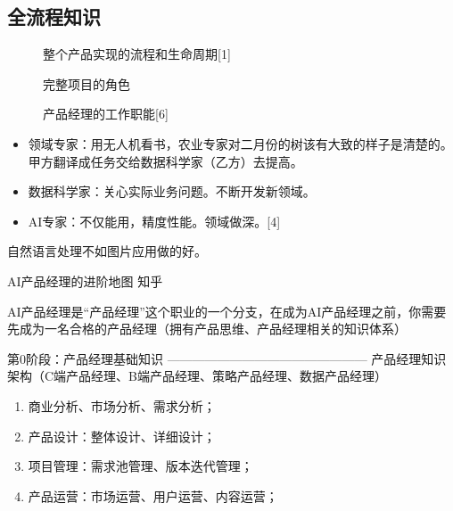\documentclass[letterpaper,10pt,english]{sphinxmanual}
\begin{document}
\subsection{全流程知识}
\label{\detokenize{chapter_knowledge/index:chap-skill}}\label{\detokenize{chapter_knowledge/index:id1}}\label{\detokenize{chapter_knowledge/index::doc}}
\begin{figure}[H]
\centering
\capstart

\noindent{}
\caption{整个产品实现的流程和生命周期{[}1{]}}\label{\detokenize{chapter_knowledge/index:id2}}\end{figure}

\begin{figure}[H]
\centering
\capstart

\noindent{}
\caption{完整项目的角色}\label{\detokenize{chapter_knowledge/index:id3}}\end{figure}

\begin{figure}[H]
\centering
\capstart

\noindent{}
\caption{产品经理的工作职能{[}6{]}}\label{\detokenize{chapter_knowledge/index:id4}}\end{figure}
\begin{itemize}
\item {} 
领域专家：用无人机看书，农业专家对二月份的树该有大致的样子是清楚的。甲方翻译成任务交给数据科学家（乙方）去提高。

\item {} 
数据科学家：关心实际业务问题。不断开发新领域。

\item {} 
AI专家：不仅能用，精度性能。领域做深。{[}4{]}

\end{itemize}

自然语言处理不如图片应用做的好。


AI产品经理的进阶地图 \sphinxhyphen{} 知乎

AI产品经理是“产品经理”这个职业的一个分支，在成为AI产品经理之前，你需要先成为一名合格的产品经理（拥有产品思维、产品经理相关的知识体系）

第0阶段：产品经理基础知识 ————————————————
产品经理知识架构（C端产品经理、B端产品经理、策略产品经理、数据产品经理）
\begin{enumerate}
%
\item {} 
商业分析、市场分析、需求分析；

\item {} 
产品设计：整体设计、详细设计；

\item {} 
项目管理：需求池管理、版本迭代管理；

\item {} 
产品运营：市场运营、用户运营、内容运营；

\end{enumerate}
\end{document}

